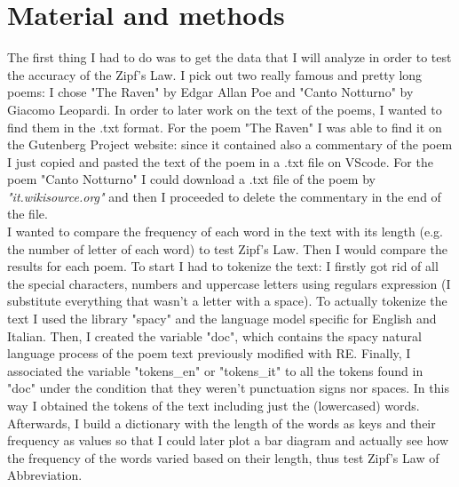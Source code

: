 \section{Material and methods}
The first thing I had to do was to get the data that I will analyze in order to test the accuracy of the Zipf's Law. 
I pick out two really famous and pretty long poems: I chose "The Raven" by Edgar Allan Poe and "Canto Notturno" by Giacomo Leopardi.
In order to later work on the text of the poems, I wanted to find them in the .txt format. For the poem "The Raven" I was able to find it on the Gutenberg Project website: since it contained also a commentary of the poem I just copied and pasted the text of the poem in a .txt file on VScode. 
For the poem "Canto Notturno" I could download a .txt file of the poem by \textit{"it.wikisource.org"} and then I proceeded to delete the commentary in the end of the file.\\
I wanted to compare the frequency of each word in the text with its length (e.g. the number of letter of each word) to test Zipf's Law. Then I would compare the results for each poem.
To start I had to tokenize the text: I firstly got rid of all the special characters, numbers and uppercase letters using regulars expression (I substitute everything that wasn't a letter with a space). 
To actually tokenize the text I used the library "spacy" and the language model specific for English and Italian. 
Then, I created the variable "doc", which contains the spacy natural language process of the poem text previously modified with RE. 
Finally, I associated the variable "tokens\_en" or "tokens\_it" to all the tokens found in "doc" under the condition that they weren't punctuation signs nor spaces.
In this way I obtained the tokens of the text including just the (lowercased) words.\\
Afterwards, I build a dictionary with the length of the words as keys and their frequency as values so that I could later plot a bar diagram and actually see how the frequency of the words varied based on their length, thus test Zipf's Law of Abbreviation. 

